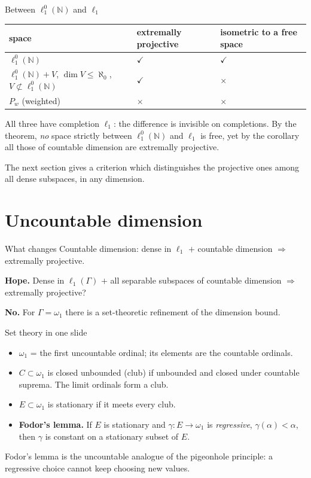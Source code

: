\documentclass[10pt,aspectratio=169]{beamer}
\newcommand{\lo}[1]{\ell_1^0(#1)}
\newcommand{\ellone}[1]{\ell_1(#1)}
\newcommand{\NN}{\mathbb N}
\newcommand{\yes}{\textcolor{good}{$\checkmark$}}
\newcommand{\no}{\textcolor{accent}{$\boldsymbol\times$}}
\begin{document}
\begin{frame}{Between $\lo\NN$ and $\ell_1$}
  \begin{center}
    \begin{tabular}{@{}lll@{}}
      \toprule
      space & extremally projective & isometric to a free space\\
      \midrule
      $\lo\NN$ & \yes & \yes\\
      $\lo\NN+V$, $\dim V\le\aleph_0$, $V\not\subset\lo\NN$ & \yes & \no\\
      $P_w$ (weighted) & \no & \no\\
      \bottomrule
    \end{tabular}
  \end{center}
  \medskip
  All three have completion $\ell_1$: the difference is invisible on
  completions. By the theorem, \emph{no} space strictly between $\lo\NN$ and
  $\ell_1$ is free, yet by the corollary all those of countable dimension are
  extremally projective.
  \medskip

  The next section gives a criterion which distinguishes the projective ones
  among all dense subspaces, in any dimension.
\end{frame}

\section{Uncountable dimension}

\begin{frame}{What changes}
  Countable dimension: dense in $\ell_1$ $+$ countable dimension
  $\Rightarrow$ extremally projective.
  \medskip

  \textbf{Hope.} Dense in $\ellone\Gamma$ $+$ all separable subspaces of countable
  dimension $\Rightarrow$ extremally projective?
  \medskip

  \textbf{No.} For $\Gamma=\omega_1$ there is a set-theoretic refinement of the
  dimension bound.
  \begin{block}{Set theory in one slide}
    \begin{itemize}
      \item $\omega_1$ = the first uncountable ordinal; its elements are the
        countable ordinals.
      \item $C\subset\omega_1$ is \alert{closed unbounded} (club) if unbounded and
        closed under countable suprema. The limit ordinals form a club.
      \item $E\subset\omega_1$ is \alert{stationary} if it meets every club.
      \item \textbf{Fodor's lemma.} If $E$ is stationary and
        $\gamma\colon E\to\omega_1$ is \emph{regressive}, $\gamma(\alpha)<\alpha$,
        then $\gamma$ is constant on a stationary subset of $E$.
    \end{itemize}
  \end{block}
  Fodor's lemma is the uncountable analogue of the pigeonhole principle: a
  regressive choice cannot keep choosing new values.
\end{frame}
\end{document}
